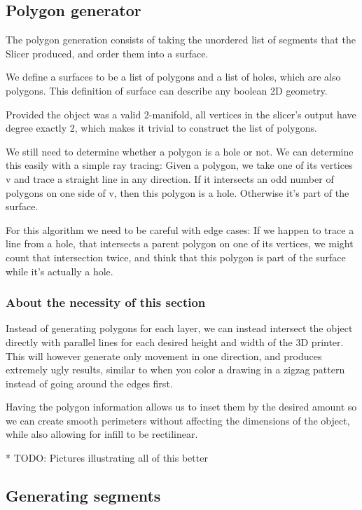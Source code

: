 \subsection{Polygon generator}
The polygon generation consists of taking the unordered list of segments that the Slicer produced, and order them into a surface.

We define a surfaces to be a list of polygons and a list of holes, which are also polygons. This definition of surface can describe any boolean 2D geometry.

Provided the object was a valid 2-manifold, all vertices in the slicer's output have degree exactly 2, which makes it trivial to construct the list of polygons.

We still need to determine whether a polygon is a hole or not. We can determine this easily with a simple ray tracing: Given a polygon, we take one of its vertices v and trace a straight line in any direction. If it intersects an odd number of polygons on one side of v, then this polygon is a hole. Otherwise it's part of the surface.

For this algorithm we need to be careful with edge cases: If we happen to trace a line from a hole, that intersects a parent polygon on one of its vertices, we might count that intersection twice, and think that this polygon is part of the surface while it's actually a hole.

\subsubsection{About the necessity of this section}
Instead of generating polygons for each layer, we can instead intersect the object directly with parallel lines for each desired height and width of the 3D printer. This will however generate only movement in one direction, and produces extremely ugly results, similar to when you color a drawing in a zigzag pattern instead of going around the edges first.

Having the polygon information allows us to inset them by the desired amount so we can create smooth perimeters without affecting the dimensions of the object, while also allowing for infill to be rectilinear.

* TODO: Pictures illustrating all of this better

\subsection{Generating segments}

